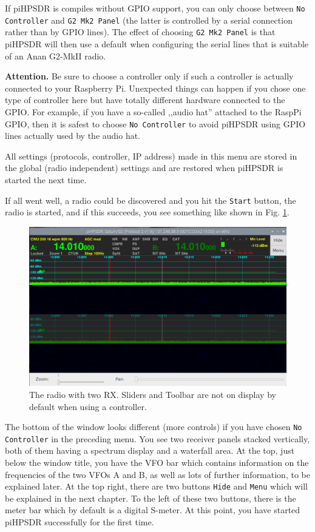 \documentclass[12pt]{book}
\def\rett#1{\texttt{\color{red}#1}}
\def\pH{pi\-HPSDR }
\begin{document}
If \pH is compiles without GPIO support, you can only choose between \rett{No Controller} and
\rett{G2 Mk2 Panel} (the latter is controlled by a serial connection rather than by GPIO lines).
The effect of choosing \rett{G2 Mk2 Panel} is that \pH will then use a default when configuring
the serial lines that is suitable of an Anan G2-MkII radio.

\textbf{Attention.} Be sure to choose a controller only if such a controller is actually connected to your
Raspberry Pi. Unexpected things can happen if you chose one type of controller here but have totally different
hardware connected to the GPIO. For example, if you have a so-called ,,audio hat'' attached to the RaspPi
GPIO, then it is safest to choose \texttt{No Controller} to avoid \pH using GPIO lines actually used
by the audio hat.

All settings (protocols, controller, IP address) made in this menu are stored in the global (radio
independent) settings
and are restored when \pH is started the next time.

If all went well, a radio could be discovered and you hit the \rett{Start} button, the radio is started, and
if this succeeds, you see something like shown in Fig. \ref{fig:FirstDisplay}.

\begin{figure}
\center
\includegraphics[width=12cm]{FirstDisplay.png}
\caption{The radio with two RX. Sliders and Toolbar are not on display
by default when using a controller.}
\label{fig:FirstDisplay}
\end{figure}

The bottom of the window looks different (more controls) if you have chosen \rett{No Controller} in the
preceding menu.
You see two receiver panels stacked vertically, both of them having a spectrum display and a waterfall area.
At the top,
just below the window title, you have the VFO bar which contains information on the frequencies of the two
VFOs A and B,
as well as lots of further information, to be explained later. At the top right, there are two buttons
\rett{Hide}
and \rett{Menu} which will be explained in the next chapter. To the left of these two buttons, there is the
meter bar which by default is a digital S-meter. At this point, you have started \pH successfully for
the first time.
\end{document}
